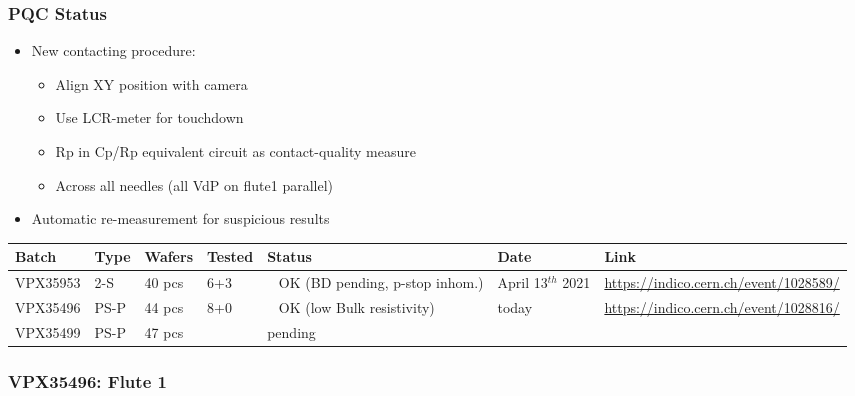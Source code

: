 \documentclass{beamer}
\begin{document}
	
	\begin{frame}
		\frametitle{PQC Status}
		
		\begin{itemize}
			\item{New contacting procedure:}
			\begin{itemize}
				\item{Align XY position with camera}
				\item{Use LCR-meter for touchdown}
				\item{Rp in Cp/Rp equivalent circuit as contact-quality measure}
				\item{Across all needles (all VdP on flute1 parallel)}
			\end{itemize}
			\item{Automatic re-measurement for suspicious results}

		\end{itemize}
	
	
		\begin{center}
			\fontsize{7pt}{9pt}\selectfont
			\begin{tabular}{ |l|l|l|l|L{2.5cm}|l|L{1.5cm}| }
				\hline
				 Batch & Type & Wafers & Tested & Status & Date & Link \\
				 \hline
				 VPX35953 & 2-S & 40 pcs & 6+3 & \ \color{dgreen} OK \color{dorange} (BD pending, p-stop inhom.) & April 13$^{th}$ 2021 & \fontsize{5pt}{6pt}\selectfont \href{https://indico.cern.ch/event/1028589/}{https://indico.cern.ch/event/1028589/} \\
\hline
				VPX35496 & PS-P & 44 pcs & 8+0 & \ \color{dgreen} OK \color{dorange} (low Bulk resistivity) & today & \fontsize{5pt}{6pt}\selectfont \href{https://indico.cern.ch/event/1028816/}{https://indico.cern.ch/event/1028816/} \\
\hline
				VPX35499 & PS-P & 47 pcs & & pending & & \\
				 \hline
			\end{tabular}
		\end{center}
	
	\end{frame}
	
	
	\def\batch{VPX35496}
	
	\begin{frame}
		\frametitle{\batch: Flute 1}
		
	\end{frame}
\end{document}
